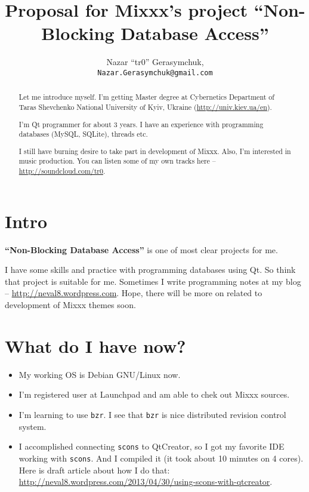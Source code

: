\documentclass[a4paper,12pt]{scrartcl}
\title{Proposal for Mixxx's project ``Non-Blocking Database Access''}
\author{Nazar ``tr0'' Gerasymchuk, \\ \texttt{\normalsize Nazar.Gerasymchuk@gmail.com}}
\begin{document}
\maketitle
\nvDash
\begin{abstract}
Let me introduce myself. I'm getting Master degree at Cybernetics
Department of Taras Shevchenko National University of Kyiv, Ukraine (\url{http://univ.kiev.ua/en}).

I'm Qt programmer for about 3 years. I have an experience with programming databases (MySQL, SQLite), threads etc.

I still have burning desire to take part in development of Mixxx. Also, I'm interested in music production. You can listen some of my own tracks here -- \url{http://soundcloud.com/tr0}.
\end{abstract}

\tableofcontents

\section{Intro}

\textbf{``Non-Blocking Database Access''} is one of most clear projects for me.

I have some skills and practice with programming databases using Qt. So think that project is suitable for me. Sometimes I write programming notes at my blog -- \url{http://neval8.wordpress.com}. Hope, there will be more on related to development of Mixxx themes soon.

\section{What do I have now?}
\begin{itemize}
 \item My working OS is Debian GNU/Linux now.
 \item I'm registered user at Launchpad and am able to chek out Mixxx sources.
 \item I'm learning to use \texttt{bzr}. I see that \texttt{bzr} is nice distributed revision control system.
 \item I accomplished connecting \texttt{scons} to QtCreator, so I got my favorite IDE working with \texttt{scons}. 
 And I compiled it (it took about 10 minutes on 4 cores). Here is draft article about how I do that: \\ \url{http://neval8.wordpress.com/2013/04/30/using-scons-with-qtcreator}.
\end{itemize}
\end{document}
